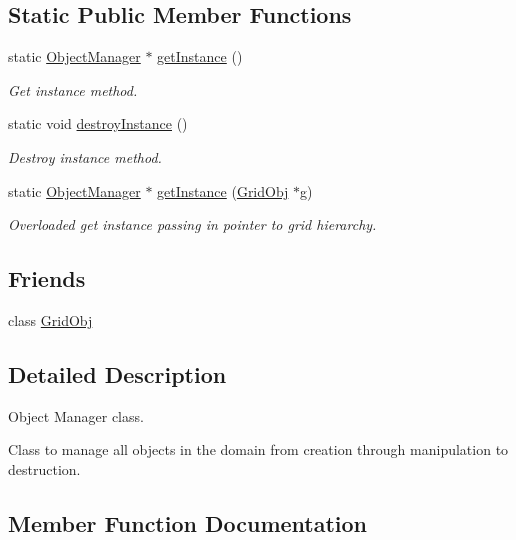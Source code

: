 \subsection*{Static Public Member Functions}
\begin{DoxyCompactItemize}
\item 
static \hyperlink{class_object_manager}{Object\+Manager} $\ast$ \hyperlink{class_object_manager_acf7a2f12f034c76d9e3a5aa5837dddb5}{get\+Instance} ()
\begin{DoxyCompactList}\small\item\em Get instance method. \end{DoxyCompactList}\item 
static void \hyperlink{class_object_manager_a5945decc43eb5fdeaaad101fa7aa282f}{destroy\+Instance} ()
\begin{DoxyCompactList}\small\item\em Destroy instance method. \end{DoxyCompactList}\item 
static \hyperlink{class_object_manager}{Object\+Manager} $\ast$ \hyperlink{class_object_manager_a3c648f3d7388df47db0db9fcb4b8b618}{get\+Instance} (\hyperlink{class_grid_obj}{Grid\+Obj} $\ast$g)
\begin{DoxyCompactList}\small\item\em Overloaded get instance passing in pointer to grid hierarchy. \end{DoxyCompactList}\end{DoxyCompactItemize}
\subsection*{Friends}
\begin{DoxyCompactItemize}
\item 
class \hyperlink{class_object_manager_a55cfec1721fb1b9d9e7592bd6288c998}{Grid\+Obj}
\end{DoxyCompactItemize}


\subsection{Detailed Description}
Object Manager class. 

Class to manage all objects in the domain from creation through manipulation to destruction. 

\subsection{Member Function Documentation}
